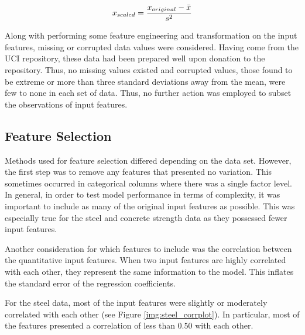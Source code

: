 \documentclass[10pt]{article}\usepackage[]{graphicx}\usepackage[]{xcolor}
\begin{document}
\begin{equation*}
    x_{scaled} = \frac{x_{original} - \bar{x}}{s^2} \\
\end{equation*}

Along with performing some feature engineering and transformation on the input features, missing or corrupted data values were considered. Having come from the UCI repository, these data had been prepared well upon donation to the repository. Thus, no missing values existed and corrupted values, those found to be extreme or more than three standard deviations away from the mean, were few to none in each set of data. Thus, no further action was employed to subset the observations of input features.

\subsection{Feature Selection}
Methods used for feature selection differed depending on the data set. However, the first step was to remove any features that presented no variation. This sometimes occurred in categorical columns where there was a single factor level. In general, in order to test model performance in terms of complexity, it was important to include as many of the original input features as possible. This was especially true for the steel and concrete strength data as they possessed fewer input features.

Another consideration for which features to include was the correlation between the quantitative input features. When two input features are highly correlated with each other, they represent the same information to the model. This inflates the standard error of the regression coefficients. 

For the steel data, most of the input features were slightly or moderately correlated with each other (see Figure \ref{img:steel_corrplot}). In particular, most of the features presented a correlation of less than $0.50$ with each other. \\
\end{document}

